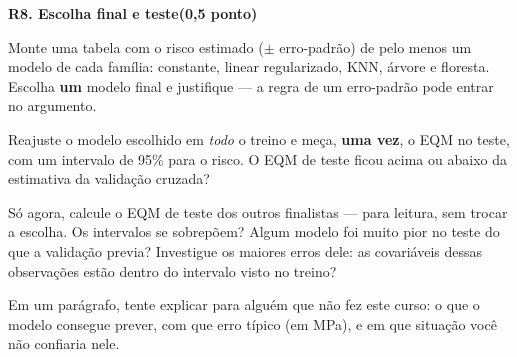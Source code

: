 \documentclass[11pt,a4paper]{article}
\newcommand{\tarefa}[3]{%
  \bigskip\par\noindent
  {\large\bfseries\color{azulufrj}#1. #2}\hfill{\bfseries(#3)}\par
  \nopagebreak\vspace{0.3em}}
\begin{document}
\tarefa{R8}{Escolha final e teste}{0,5 ponto}

\begin{itens}
  \item Monte uma tabela com o risco estimado ($\pm$ erro-padrão) de pelo menos um
        modelo de cada família: constante, linear regularizado, KNN, árvore e
        floresta. Escolha \textbf{um} modelo final e
        justifique --- a regra de um erro-padrão pode entrar no argumento.
  \item Reajuste o modelo escolhido em \emph{todo} o treino e meça, \textbf{uma
        vez}, o EQM no teste, com um intervalo de 95\% para o risco. O EQM de
        teste ficou acima ou abaixo da estimativa da validação cruzada?
  \item Só agora, calcule o EQM de teste dos outros finalistas --- para leitura, sem
        trocar a escolha. Os intervalos se sobrepõem? Algum modelo foi muito pior no
        teste do que a validação previa? Investigue os maiores erros dele: as
        covariáveis dessas observações estão dentro do intervalo visto no treino?
  \item Em um parágrafo, tente explicar para alguém que não fez este curso: o que o modelo
        consegue prever, com que erro típico (em MPa), e em que situação você não
        confiaria nele.
\end{itens}
\end{document}
